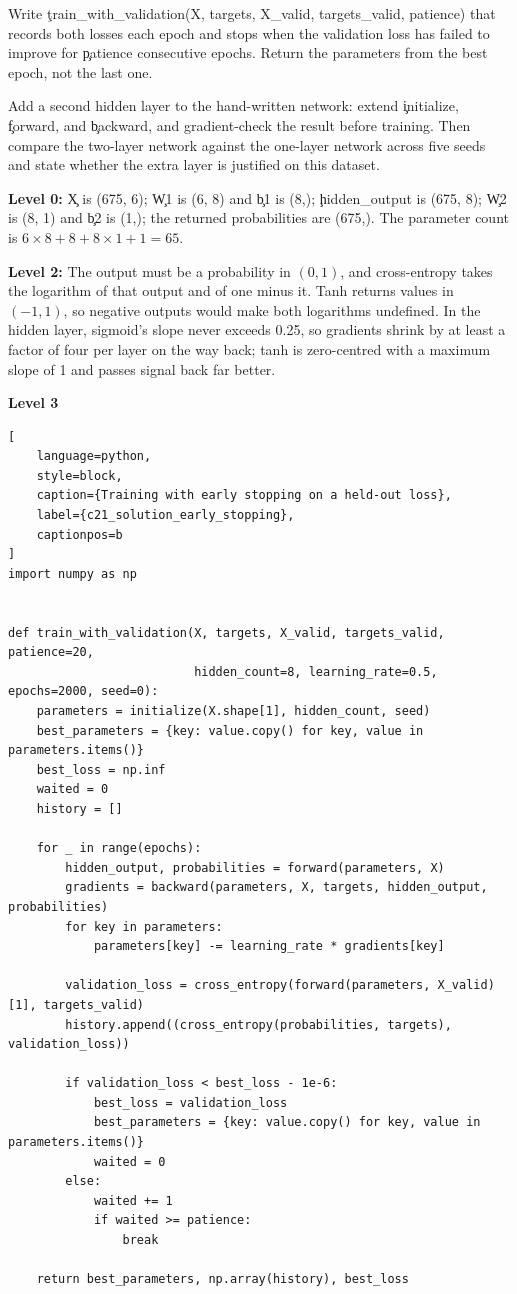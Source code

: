 
Write \c{train_with_validation(X, targets, X_valid, targets_valid, patience)}
that records both losses each epoch and stops when the validation loss has failed
to improve for \c{patience} consecutive epochs. Return the parameters from the
best epoch, not the last one.


Add a second hidden layer to the hand-written network: extend \c{initialize},
\c{forward}, and \c{backward}, and gradient-check the result before training.
Then compare the two-layer network against the one-layer network across five
seeds and state whether the extra layer is justified on this dataset.


\textbf{Level 0:} \c{X} is (675, 6); \c{W1} is (6, 8) and \c{b1} is (8,);
\c{hidden_output} is (675, 8); \c{W2} is (8, 1) and \c{b2} is (1,); the returned
probabilities are (675,). The parameter count is
$6 \times 8 + 8 + 8 \times 1 + 1 = 65$.

\textbf{Level 2:} The output must be a probability in $(0, 1)$, and cross-entropy
takes the logarithm of that output and of one minus it. Tanh returns values in
$(-1, 1)$, so negative outputs would make both logarithms undefined. In the
hidden layer, sigmoid's slope never exceeds 0.25, so gradients shrink by at least
a factor of four per layer on the way back; tanh is zero-centred with a maximum
slope of 1 and passes signal back far better.

\textbf{Level 3}

\begin{lstlisting}[
    language=python,
    style=block,
    caption={Training with early stopping on a held-out loss},
    label={c21_solution_early_stopping},
    captionpos=b
]
import numpy as np


def train_with_validation(X, targets, X_valid, targets_valid, patience=20,
                          hidden_count=8, learning_rate=0.5, epochs=2000, seed=0):
    parameters = initialize(X.shape[1], hidden_count, seed)
    best_parameters = {key: value.copy() for key, value in parameters.items()}
    best_loss = np.inf
    waited = 0
    history = []

    for _ in range(epochs):
        hidden_output, probabilities = forward(parameters, X)
        gradients = backward(parameters, X, targets, hidden_output, probabilities)
        for key in parameters:
            parameters[key] -= learning_rate * gradients[key]

        validation_loss = cross_entropy(forward(parameters, X_valid)[1], targets_valid)
        history.append((cross_entropy(probabilities, targets), validation_loss))

        if validation_loss < best_loss - 1e-6:
            best_loss = validation_loss
            best_parameters = {key: value.copy() for key, value in parameters.items()}
            waited = 0
        else:
            waited += 1
            if waited >= patience:
                break

    return best_parameters, np.array(history), best_loss
\end{lstlisting}

